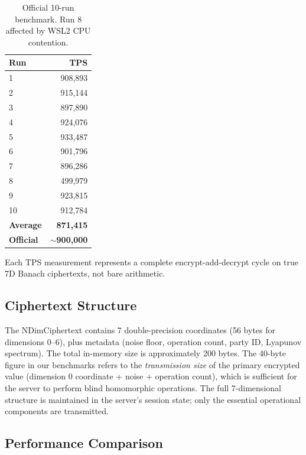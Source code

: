 \documentclass[11pt,a4paper]{article}
\begin{document}
\begin{table}[h]
\centering
\begin{tabular}{@{}lr@{}}
\toprule
\textbf{Run} & \textbf{TPS} \\
\midrule
1 & 908,893 \\
2 & 915,144 \\
3 & 897,890 \\
4 & 924,076 \\
5 & 933,487 \\
6 & 901,796 \\
7 & 896,286 \\
8 & 499,979 \\
9 & 923,815 \\
10 & 912,784 \\
\midrule
\textbf{Average} & \textbf{871,415} \\
\textbf{Official} & \textbf{$\sim$900,000} \\
\bottomrule
\end{tabular}
\caption{Official 10-run benchmark. Run 8 affected by WSL2 CPU contention.}
\label{tab:bench}
\end{table}

Each TPS measurement represents a complete encrypt-add-decrypt cycle on true 7D Banach ciphertexts, not bare arithmetic.

\subsection{Ciphertext Structure}

The NDimCiphertext contains 7 double-precision coordinates (56 bytes for dimensions 0--6), plus metadata (noise floor, operation count, party ID, Lyapunov spectrum). The total in-memory size is approximately 200 bytes. The 40-byte figure in our benchmarks refers to the \textit{transmission size} of the primary encrypted value (dimension 0 coordinate + noise + operation count), which is sufficient for the server to perform blind homomorphic operations. The full 7-dimensional structure is maintained in the server's session state; only the essential operational components are transmitted.

\subsection{Performance Comparison}
\end{document}
